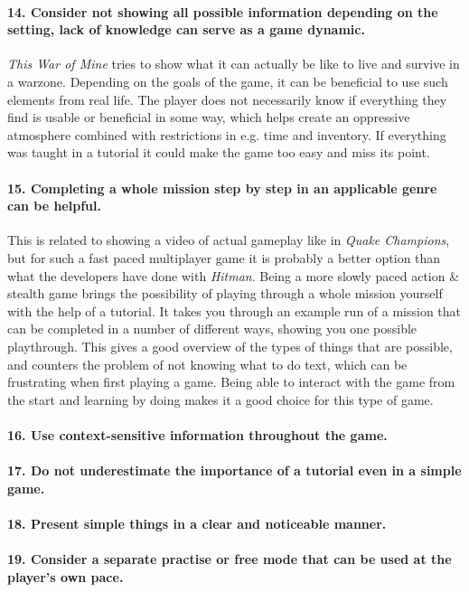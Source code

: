 \paragraph{14. Consider not showing all possible information depending on the setting, lack of knowledge can serve as a game dynamic.}
\textit{This War of Mine} tries to show what it can actually be like to live and survive in a warzone. Depending on the goals of the game, it can be beneficial to use such elements from real life. The player does not necessarily know if everything they find is usable or beneficial in some way, which helps create an oppressive atmosphere combined with restrictions in e.g. time and inventory. If everything was taught in a tutorial it could make the game too easy and miss its point.
\paragraph{15. Completing a whole mission step by step in an applicable genre can be helpful.}
This is related to showing a video of actual gameplay like in \textit{Quake Champions}, but for such a fast paced multiplayer game it is probably a better option than what the developers have done with \textit{Hitman}. Being a more slowly paced action \& stealth game brings the possibility of playing through a whole mission yourself with the help of a tutorial. It takes you through an example run of a mission that can be completed in a number of different ways, showing you one possible playthrough. This gives a good overview of the types of things that are possible, and counters the problem of not knowing what to do text, which can be frustrating when first playing a game. Being able to interact with the game from the start and learning by doing makes it a good choice for this type of game.
\paragraph{16. Use context-sensitive information throughout the game.}

\paragraph{17. Do not underestimate the importance of a tutorial even in a simple game.}
\paragraph{18. Present simple things in a clear and noticeable manner.}
\paragraph{19. Consider a separate practise or free mode that can be used at the player's own pace.}
